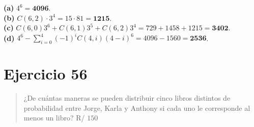 \documentclass[11pt]{article}
\begin{document}
\begin{resp}
\textbf{(a)} $4^6=\mathbf{4096}$.\\
\textbf{(b)} $C(6,2)\cdot 3^4=15\cdot 81=\mathbf{1215}$.\\
\textbf{(c)} $C(6,0)3^6+C(6,1)3^5+C(6,2)3^4=729+1458+1215=\mathbf{3402}$.\\
\textbf{(d)} $4^6-\sum_{i=0}^{4}(-1)^iC(4,i)(4-i)^6=4096-1560=\mathbf{2536}$.
\end{resp}

\section*{Ejercicio 56}

\begin{quote}
¿De cuántas maneras se pueden distribuir cinco libros distintos de probabilidad entre Jorge, Karla y Anthony si cada uno le corresponde al menos un libro? \hfill R/ $150$
\end{quote}
\end{document}
